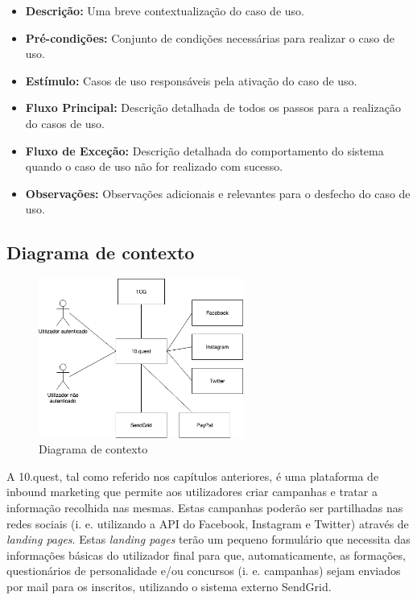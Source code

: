 \begin{itemize}
	\item \textbf{Descrição:} Uma breve contextualização do caso de uso.
	\item \textbf{Pré-condições:} Conjunto de condições necessárias para realizar o caso de uso.
	\item \textbf{Estímulo:} Casos de uso responsáveis pela ativação do caso de uso.
	\item \textbf{Fluxo Principal:} Descrição detalhada de todos os passos para a realização do casos de uso.
	\item \textbf{Fluxo de Exceção:} Descrição detalhada do comportamento do sistema quando o caso de uso não for realizado com sucesso.
	\item \textbf{Observações:} Observações adicionais e relevantes para o desfecho do caso de uso.
\end{itemize}

\newpage

\subsection{Diagrama de contexto}
\label{d:contexto}
\begin{figure}[ht!]
	\begin{center}
		\includegraphics[width=0.6\textwidth]{img/rf/10quest}
		\caption{Diagrama de contexto}
		\label{fig:rf-10quest}
	\end{center}
\end{figure}

A 10.quest, tal como referido nos capítulos anteriores, é uma plataforma de inbound marketing que permite aos utilizadores criar campanhas e tratar a informação recolhida nas mesmas. 
Estas campanhas poderão ser partilhadas nas redes sociais (i. e. utilizando a API do Facebook, Instagram e Twitter) através de \textit{landing pages}. Estas \textit{landing pages} terão um pequeno formulário que necessita das informações básicas do utilizador final para que, automaticamente, as formações, questionários de personalidade e/ou concursos (i. e. campanhas) sejam enviados por mail para os inscritos, utilizando o sistema externo SendGrid.

